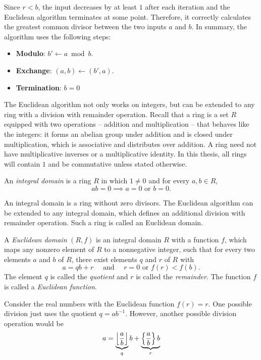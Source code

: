 Since $r < b$, the input decreases by at least $1$ after each iteration
and the Euclidean algorithm terminates at some point.
Therefore, it correctly calculates the greatest common divisor between the two
inputs $a$ and $b$.
In summary, the algorithm uses the following steps:
\begin{itemize}
  \item \textbf{Modulo}: $b' ← a \bmod b$.
  \item \textbf{Exchange}: $(a, b) ← (b', a)$.
  \item \textbf{Termination}: $b = 0$
\end{itemize}

The Euclidean algorithm not only works on integers,
but can be extended to any ring with a division with remainder operation.
Recall that a ring is a set $R$ equipped with two operations -- addition and
multiplication -- that behaves like the integers:
it forms an abelian group under addition and is closed under multiplication,
which is associative and distributes over addition.
A ring need not have multiplicative inverses or a multiplicative identity.
In this thesis, all rings will contain $1$ and be commutative unless stated
otherwise.

\begin{definition}
  An \emph{integral domain} is a ring $R$ in which $1 ≠ 0$ and for every $a, b ∈ R$,
  \[
    ab = 0 \implies a = 0 \text{ or } b = 0.
  \]
\end{definition}

An integral domain is a ring without zero divisors.
The Euclidean algorithm can be extended to any integral domain,
which defines an additional division with remainder operation.
Such a ring is called an Euclidean domain.

\begin{definition}
  A \emph{Euclidean domain} $(R, f)$ is an integral domain $R$ with a function $f$,
  which maps any nonzero element of $R$ to a nonnegative integer,
  such that for every two elements $a$ and $b$ of $R$, there exist elements $q$ and $r$ of $R$ with
  \[
    a = qb + r \quad \text{ and } \quad r = 0 \text{ or } f(r) < f(b).
  \]
  The element $q$ is called the \emph{quotient} and $r$ is called the \emph{remainder}.
  The function $f$ is called a \emph{Euclidean function}.
\end{definition}

\begin{example}
  \label{ex:real-divmod}
  Consider the real numbers with the Euclidean function $f(r) = r$.
  One possible division just uses the quotient $q = ab^{-1}$.
  However,
  another possible division operation would be
  \[
    a = \underbrace{\left\lfloor\frac{a}{b}\right\rfloor}_q b + \underbrace{\left\{ \frac{a}{b} \right\} b}_r
  \]
\end{example}

